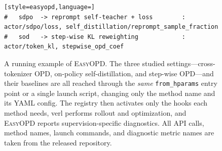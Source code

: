 \begin{figure}[t]
\begin{tcolorbox}
\begin{lstlisting}[style=easyopd,language=]
#   sdpo  -> reprompt self-teacher + loss        : actor/sdpo/loss, self_distillation/reprompt_sample_fraction
#   sod   -> step-wise KL reweighting            : actor/token_kl, stepwise_opd_coef
    \end{lstlisting}
    \end{tcolorbox}
    \caption{A running example of \textsc{EasyOPD}. The three studied settings---cross-tokenizer OPD, on-policy self-distillation, and step-wise OPD---and their baselines are all reached through the \emph{same} \texttt{from\_hparams} entry point or a single launch script, changing only the method name and its YAML config. The registry then activates only the hooks each method needs, verl performs rollout and optimization, and \textsc{EasyOPD} reports supervision-specific diagnostics. All API calls, method names, launch commands, and diagnostic metric names are taken from the released repository.}
    \label{fig:running_example}
\end{figure}

